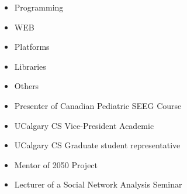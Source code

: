 


\begin{itemize}
	\item \textcolor{emphasis}{Programming} 
\end{itemize}


\divider\smallskip

\begin{itemize}
	\item \textcolor{emphasis}{WEB} 
\end{itemize}

\divider\smallskip

\begin{itemize}
	\item \textcolor{emphasis}{Platforms}
\end{itemize}

\divider\smallskip

\begin{itemize}
	\item \textcolor{emphasis}{Libraries}
\end{itemize}
 

\divider\smallskip

\begin{itemize}
	\item \textcolor{emphasis}{Others}
\end{itemize}

\begin{itemize}
	\item Presenter of Canadian Pediatric SEEG Course
	      
	\item UCalgary CS Vice-President Academic
	      
	\item UCalgary CS Graduate student representative
	      
	\item Mentor of 2050 Project
 
        \item Lecturer of a Social Network Analysis Seminar
\end{itemize}
